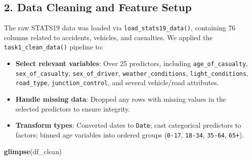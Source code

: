 \documentclass[
]{article}
\newenvironment{Shaded}{\begin{snugshade}}{\end{snugshade}}
\newcommand{\FunctionTok}[1]{\textcolor[rgb]{0.13,0.29,0.53}{\textbf{#1}}}
\newcommand{\NormalTok}[1]{#1}
\providecommand{\tightlist}{%
  \setlength{\itemsep}{0pt}\setlength{\parskip}{0pt}}
\begin{document}
\subsection{2. Data Cleaning and Feature
Setup}\label{data-cleaning-and-feature-setup}

The raw STATS19 data was loaded via \texttt{load\_stats19\_data()},
containing 76 columns related to accidents, vehicles, and casualties. We
applied the \texttt{task1\_clean\_data()} pipeline to:

\begin{itemize}
\tightlist
\item
  \textbf{Select relevant variables}: Over 25 predictors, including
  \texttt{age\_of\_casualty}, \texttt{sex\_of\_casualty},
  \texttt{sex\_of\_driver}, \texttt{weather\_conditions},
  \texttt{light\_conditions}, \texttt{road\_type},
  \texttt{junction\_control}, and several vehicle/road attributes.
\item
  \textbf{Handle missing data}: Dropped any rows with missing values in
  the selected predictors to ensure integrity.
\item
  \textbf{Transform types}: Converted dates to \texttt{Date}; cast
  categorical predictors to factors; binned age variables into ordered
  groups (\texttt{0-17}, \texttt{18-34}, \texttt{35-64}, \texttt{65+}).
\end{itemize}

\begin{Shaded}
\begin{Highlighting}[]
\FunctionTok{glimpse}\NormalTok{(df\_clean)}
\end{Highlighting}
\end{Shaded}
\end{document}

